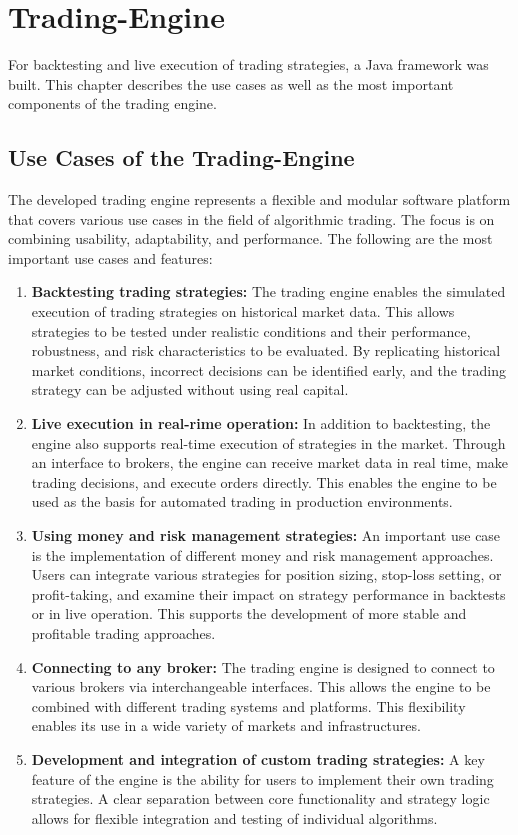 \section{Trading-Engine}
\label{chap:te}

For backtesting and live execution of trading strategies, a Java framework was built.
This chapter describes the use cases as well as the most important components of the trading engine.

\subsection{Use Cases of the Trading-Engine}
\label{chap:te-use-cases}

The developed trading engine represents a flexible and modular software platform that covers various use cases in the field of algorithmic trading.
The focus is on combining usability, adaptability, and performance.
The following are the most important use cases and features:

\begin{enumerate}
    \item \textbf{Backtesting trading strategies:} The trading engine enables the simulated execution of trading strategies on historical market data.
    This allows strategies to be tested under realistic conditions and their performance, robustness, and risk characteristics to be evaluated.
    By replicating historical market conditions, incorrect decisions can be identified early, and the trading strategy can be adjusted without using real capital.
    \item \textbf{Live execution in real-rime operation:} In addition to backtesting, the engine also supports real-time execution of strategies in the market.
    Through an interface to brokers, the engine can receive market data in real time, make trading decisions, and execute orders directly.
    This enables the engine to be used as the basis for automated trading in production environments.
    \item \textbf{Using money and risk management strategies:} An important use case is the implementation of different money and risk management approaches.
    Users can integrate various strategies for position sizing, stop-loss setting, or profit-taking, and examine their impact on strategy performance in backtests or in live operation.
    This supports the development of more stable and profitable trading approaches.
    \item \textbf{Connecting to any broker:} The trading engine is designed to connect to various brokers via interchangeable interfaces.
    This allows the engine to be combined with different trading systems and platforms.
    This flexibility enables its use in a wide variety of markets and infrastructures.
    \item \textbf{Development and integration of custom trading strategies:} A key feature of the engine is the ability for users to implement their own trading strategies.
    A clear separation between core functionality and strategy logic allows for flexible integration and testing of individual algorithms.
\end{enumerate}

